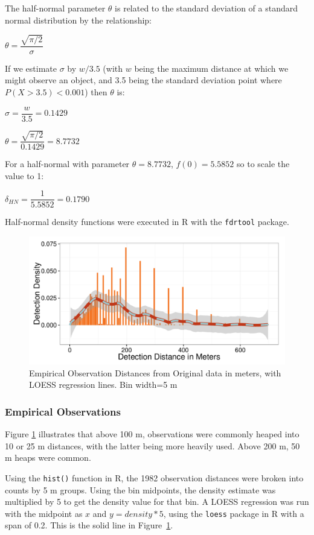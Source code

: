 \documentclass[12pt]{article}
\begin{document}
The half-normal parameter $\theta$ is related to the standard deviation of a standard normal distribution by the relationship:

$\theta = \dfrac{\sqrt{\pi /2}}{\sigma}$

If we estimate $\sigma$ by $w/3.5$ (with $w$ being the maximum distance at which we might observe an object, and 3.5 being the standard deviation point where $P(X > 3.5) < 0.001$) then $\theta$ is:

$\sigma = \dfrac{w}{3.5} = 0.1429$

$\theta = \dfrac{\sqrt{\pi /2}}{0.1429}=8.7732$

For a half-normal with parameter $\theta=8.7732$, $f(0)=5.5852$ so to scale the value to 1:
\begin{center}
$\delta_{HN} = \dfrac{1}{5.5852} = 0.1790$
\end{center}


Half-normal density functions were executed in R with the \texttt{fdrtool} package.
\begin{figure}
	\includegraphics[width=\textwidth]{../images/loess.pdf}
	\caption{Empirical Observation Distances from Original data in meters, with LOESS regression lines. Bin width=5 m\label{fig:by5}}
\end{figure}
\subsubsection{Empirical Observations}
Figure \ref{fig:by5} illustrates that above 100 m, observations were commonly heaped into 10 or 25 m distances, with the latter being more heavily used. Above 200 m, 50 m heaps were common. 

Using the \texttt{hist()} function in R, the 1982 observation distances were broken into counts by 5 m groups. Using the bin midpoints, the density estimate was multiplied by 5 to get the density value for that bin. A LOESS regression was run with the midpoint as $x$ and $y=density*5$, using the \texttt{loess} package in R with a span of 0.2. This is the solid line in Figure~\ref{fig:by5}. 
\end{document}
